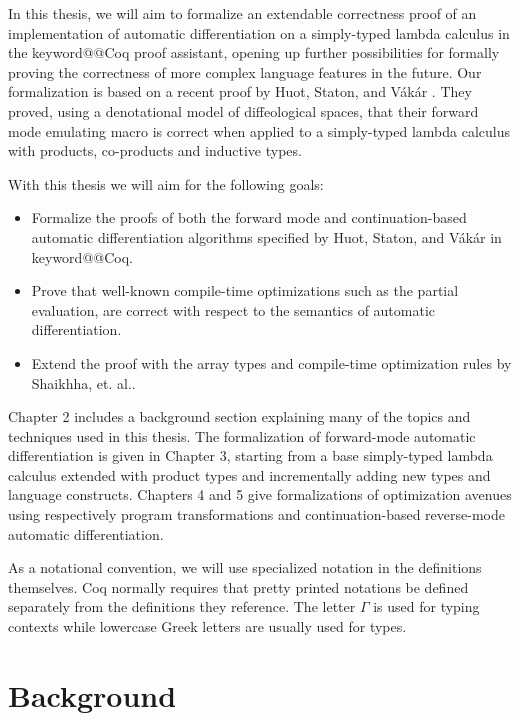 \documentclass[11pt, final]{article}
\makeatletter
\def\Vakar{V\'{a}k\'{a}r}
\def\<#1>{\csname keyword@@#1\endcsname}
\makeatother
\begin{document}
In this thesis, we will aim to formalize an extendable correctness proof of an implementation of automatic differentiation on a simply-typed lambda calculus in the \<Coq> proof assistant, opening up further possibilities for formally proving the correctness of more complex language features in the future.
Our formalization is based on a recent proof by Huot, Staton, and \Vakar{} \cite{huot2020correctness}.
They proved, using a denotational model of diffeological spaces, that their forward mode emulating macro is correct when applied to a simply-typed lambda calculus with products, co-products and inductive types.


With this thesis we will aim for the following goals:
\begin{itemize}
  \item Formalize the proofs of both the forward mode and continuation-based automatic differentiation algorithms specified by Huot, Staton, and \Vakar{} \cite{huot2020correctness} in \<Coq>.
  \item Prove that well-known compile-time optimizations such as the partial evaluation, are correct with respect to the semantics of automatic differentiation.
  \item Extend the proof with the array types and compile-time optimization rules by Shaikhha, et. al.\cite{Shaikha2019}.
\end{itemize}

Chapter 2 includes a background section explaining many of the topics and techniques used in this thesis. The formalization of forward-mode automatic differentiation is given in Chapter 3, starting from a base simply-typed lambda calculus extended with product types and incrementally adding new types and language constructs. Chapters 4 and 5 give formalizations of optimization avenues using respectively program transformations and continuation-based reverse-mode automatic differentiation.

As a notational convention, we will use specialized notation in the definitions themselves. Coq normally requires that pretty printed notations be defined separately from the definitions they reference. The letter $\Gamma$ is used for typing contexts while lowercase Greek letters are usually used for types.

\section{Background}
\end{document}

